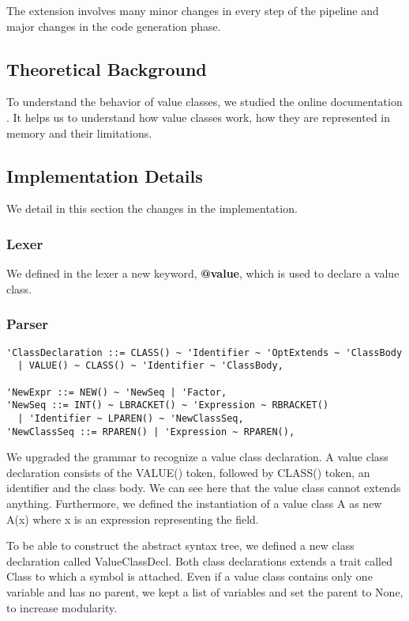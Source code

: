The extension involves many minor changes in every step of the pipeline and major changes in the code generation phase.

\subsection{Theoretical Background}
To understand the behavior of value classes, we studied the online documentation \cite{ScalaDoc}. 
It helps us to understand how value classes work, how they are represented in memory and their limitations. 

\subsection{Implementation Details}
We detail in this section the changes in the implementation.

\subsubsection{Lexer}
We defined in the lexer a new keyword, \textbf{@value}, which is used to declare a value class.

\subsubsection{Parser}
\begin{verbatim}
'ClassDeclaration ::= CLASS() ~ 'Identifier ~ 'OptExtends ~ 'ClassBody 
  | VALUE() ~ CLASS() ~ 'Identifier ~ 'ClassBody,

'NewExpr ::= NEW() ~ 'NewSeq | 'Factor,
'NewSeq ::= INT() ~ LBRACKET() ~ 'Expression ~ RBRACKET() 
  | 'Identifier ~ LPAREN() ~ 'NewClassSeq,
'NewClassSeq ::= RPAREN() | 'Expression ~ RPAREN(),
\end{verbatim}

We upgraded the grammar to recognize a value class declaration. \newline
A value class declaration consists of the VALUE() token, followed by CLASS() token, an identifier and the class body. \newline
We can see here that the value class cannot extends anything. \newline
Furthermore, we defined the instantiation of a value class A as new A(x) where x is an expression representing the field.

To be able to construct the abstract syntax tree, we defined a new class declaration called ValueClassDecl. 
Both class declarations extends a trait called Class to which a symbol is attached. \newline
Even if a value class contains only one variable and has no parent, we kept a list of variables and set the parent to None, to increase modularity.


